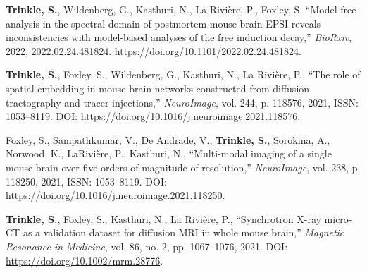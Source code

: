 \documentclass[10pt,letterpaper]{article}
\begin{document}
\begin{benumerate}{4}
\item \textbf{Trinkle, S.}, Wildenberg, G., Kasthuri, N., La Rivière, P.,
  Foxley, S. ``Model-free analysis in the spectral domain of postmortem mouse
  brain EPSI reveals inconsistencies with model-based analyses of the free
  induction decay,'' \textit{BioRxiv}, 2022,
  2022.02.24.481824. \href{https://doi.org/10.1101/2022.02.24.481824}{https://doi.org/10.1101/2022.02.24.481824}.
\item \textbf{Trinkle, S.}, Foxley, S., Wildenberg, G., Kasthuri, N., La
  Rivi\`ere, P., ``The role of spatial embedding in mouse brain networks
  constructed from diffusion tractography and tracer injections,''
  \textit{NeuroImage}, vol. 244, p. 118576, 2021, ISSN: 1053--8119. DOI:
  \href{https://doi.org/10.1016/j.neuroimage.2021.118576}{https://doi.org/10.1016/j.neuroimage.2021.118576}.
\item Foxley, S., Sampathkumar, V., De Andrade, V., \textbf{Trinkle, S.},
  Sorokina, A., Norwood, K., LaRivi\`ere, P., Kasthuri, N., ``Multi-modal
  imaging of a single mouse brain over five orders of magnitude of resolution,''
  \textit{NeuroImage}, vol. 238, p. 118250, 2021, ISSN: 1053--8119. DOI:
  \href{https://doi.org/10.1016/j.neuroimage.2021.118250}{https://doi.org/10.1016/j.neuroimage.2021.118250}.
\item \textbf{Trinkle, S.}, Foxley, S., Kasthuri, N., La Rivi\`ere, P.,
  ``Synchrotron X-ray micro-CT as a validation dataset for diffusion MRI in
  whole mouse brain,'' \textit{Magnetic Resonance in Medicine}, vol. 86, no. 2,
  pp. 1067--1076, 2021. DOI:
  \href{https://doi.org/10.1002/mrm.28776}{https://doi.org/10.1002/mrm.28776}.
\end{benumerate}
\end{document}
